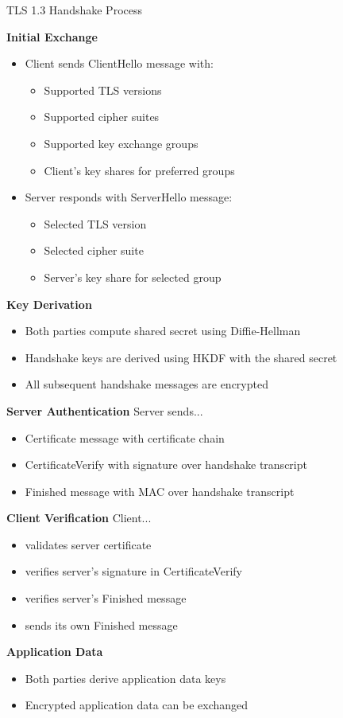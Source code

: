 \begin{KR}{TLS 1.3 Handshake Process}

\textbf{Initial Exchange}
\begin{itemize}
    \item Client sends ClientHello message with:
    \begin{itemize}
        \item Supported TLS versions
        \item Supported cipher suites
        \item Supported key exchange groups
        \item Client's key shares for preferred groups
    \end{itemize}
    \item Server responds with ServerHello message:
    \begin{itemize}
        \item Selected TLS version
        \item Selected cipher suite
        \item Server's key share for selected group
    \end{itemize}
\end{itemize}

\textbf{Key Derivation}
\begin{itemize}
    \item Both parties compute shared secret using Diffie-Hellman
    \item Handshake keys are derived using HKDF with the shared secret
    \item All subsequent handshake messages are encrypted
\end{itemize}

\textbf{Server Authentication} Server sends...
\begin{itemize}
    \item Certificate message with certificate chain
    \item CertificateVerify with signature over handshake transcript
    \item Finished message with MAC over handshake transcript
\end{itemize}

\textbf{Client Verification} Client...
\begin{itemize}
    \item validates server certificate
    \item verifies server's signature in CertificateVerify
    \item verifies server's Finished message
    \item sends its own Finished message
\end{itemize}

\textbf{Application Data}
\begin{itemize}
    \item Both parties derive application data keys
    \item Encrypted application data can be exchanged
\end{itemize}
\end{KR}




